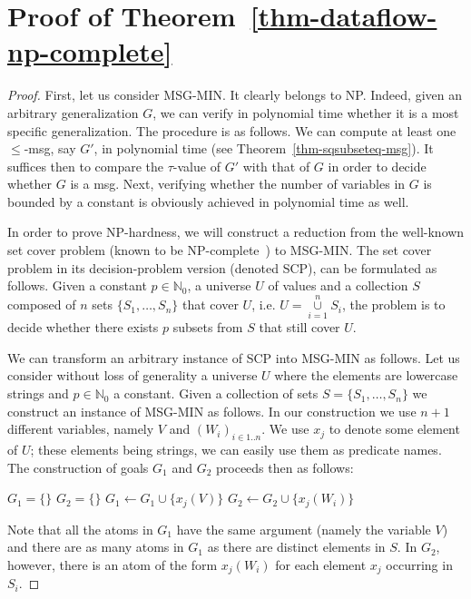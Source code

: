 	\section{Proof of Theorem~\ref{thm-dataflow-np-complete}}
\begin{proof}
	First, let us consider MSG-MIN. It clearly belongs to NP. Indeed, given an arbitrary generalization $G$, we can verify in polynomial time whether it is a most specific generalization. The procedure is as follows. We can compute at least one $\leqslant$-msg, say $G'$, in polynomial time (see Theorem~\ref{thm-sqsubseteq-msg}). It suffices then to compare the $\tau$-value of $G'$ with that of $G$ in order to decide whether $G$ is a msg. Next, verifying whether the number of variables in $G$ is bounded by a constant is obviously achieved in polynomial time as well.
	
	In order to prove NP-hardness, we will construct a reduction from the well-known set cover problem (known to be NP-complete~\cite{karp}) to MSG-MIN. The set cover problem in its decision-problem version (denoted SCP), can be formulated as follows. Given a constant $p \in \mathbb{N}_0$, a universe $U$ of values and a collection $S$ composed of $n$ sets $\{S_1, \dots, S_n\}$ that cover $U$, i.e. $U = \underset{i=1}{\overset{n}{\cup}}S_i$, the problem is to decide whether there exists $p$ subsets from $S$ that still cover $U$.
	
	We can transform an arbitrary instance of SCP into MSG-MIN as follows. Let us consider without loss of generality a universe $U$ where the elements are lowercase strings and $p \in \mathbb{N}_0$ a constant. Given a collection of sets $S=\{S_1, \dots, S_n\}$ we construct an instance of MSG-MIN as follows. In our construction we use $n+1$ different variables, namely $V$ and $(W_i)_{i\in1..n}$. We use $x_j$ to denote some element of $U$; these elements being strings, we can easily use them as predicate names. The construction of goals $G_1$ and $G_2$ proceeds then as follows:
	
	\begin{algorithmic}
		\State $G_1 = \{\}$ 
		\State $G_2 = \{\}$ 
		\State $G_1 \gets G_1\cup \{x_j(V)\}$				
		\State $G_2 \gets G_2\cup \{x_j(W_i)\}$
		\EndFor
		\EndFor
	\end{algorithmic}
	Note that all the atoms in $G_1$ have the same argument (namely the variable $V$) and there are as many atoms in $G_1$ as there are distinct elements in $S$. In $G_2$, however, there is an atom of the form $x_j(W_i)$ for each element $x_j$ occurring in $S_i$.
	

\end{proof}
